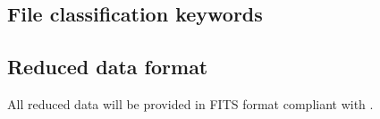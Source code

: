 \subsection{File classification keywords}
\label{ssec:file_classification_keywords}


\subsection{Reduced data format}
\label{ssec:reduced_data_format}

All reduced data will be provided in FITS format compliant with
\cite{ESO-products_standard}.


